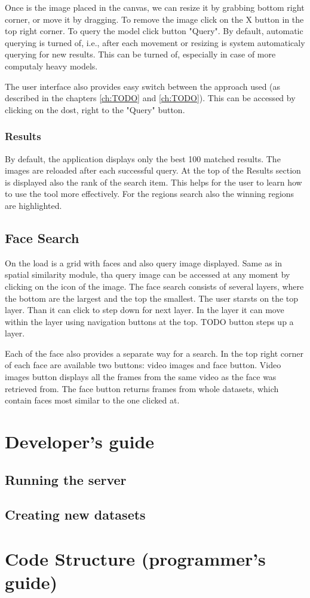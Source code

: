 Once is the image placed in the canvas, we can resize it by grabbing bottom right corner, or move it by dragging. To remove the image click on the X button in the top right corner. To query the model click button "Query". By default, automatic querying is turned of, i.e., after each movement or resizing is system automaticaly querying for new results. This can be turned of, especially in case of more computaly heavy models.

The user interface also provides easy switch between the approach used (as described in the chapters \ref{ch:TODO} and \ref{ch:TODO}). This can be accessed by clicking on the dost, right to the "Query" button. 

\subsection*{Results}

By default, the application displays only the best 100 matched results. The images are reloaded after each successful query. At the top of the Results section is displayed also the rank of the search item. This helps for the user to learn how to use the tool more effectively. For the regions search also the winning regions are highlighted.

\section{Face Search}

On the load is a grid with faces and also query image displayed. Same as in spatial similarity module, tha query image can be accessed at any moment by clicking on the icon of the image. The face search consists of several layers, where the bottom are the largest and the top the smallest. The user starsts on the top layer. Than it can click to step down for next layer. In the layer it can move within the layer using navigation buttons at the top. TODO button steps up a layer.

Each of the face also provides a separate way for a search. In the top right corner of each face are available two buttons: video images and face button. Video images button displays all the frames from the same video as the face was retrieved from. The face button returns frames from whole datasets, which contain faces most similar to the one clicked at.

\chapter{Developer's guide}

\cite{pedregosa2011scikit}
\cite{van2011numpy}

\section{Running the server}

\section{Creating new datasets}



\chapter{Code Structure (programmer's guide)}


